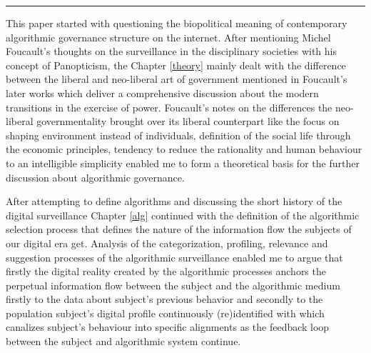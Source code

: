 \documentclass[12pt,twoside]{report}
\begin{document}
\begin{center}\rule{0.5\linewidth}{\linethickness}\end{center}

This paper started with questioning the biopolitical meaning of contemporary algorithmic governance structure on the internet. After mentioning Michel Foucault's thoughts on the surveillance in the disciplinary societies with his concept of Panopticism, the Chapter \ref{theory} mainly dealt with the difference between the liberal and neo-liberal art of government mentioned in Foucault's later works which deliver a comprehensive discussion about the modern transitions in the exercise of power. Foucault's notes on the differences the neo-liberal governmentality brought over its liberal counterpart like the focus on shaping environment instead of individuals, definition of the social life through the economic principles, tendency to reduce the rationality and human behaviour to an intelligible simplicity enabled me to form a theoretical basis for the further discussion about algorithmic governance.

After attempting to define algorithms and discussing the short history of the digital surveillance Chapter \ref{alg} continued with the definition of the algorithmic selection process that defines the nature of the information flow the subjects of our digital era get. Analysis of the categorization, profiling, relevance and suggestion processes of the algorithmic surveillance enabled me to argue that firstly the digital reality created by the algorithmic processes anchors the perpetual information flow between the subject and the algorithmic medium firstly to the data about subject's previous behavior and secondly to the population subject's digital profile continuously (re)identified with which canalizes subject's behaviour into specific alignments as the feedback loop between the subject and algorithmic system continue.
\end{document}
